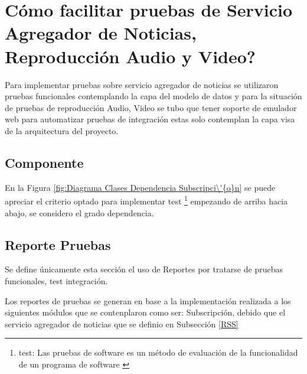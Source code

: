 \section{\textquestiondown C\'{o}mo facilitar pruebas de Servicio Agregador de Noticias, Reproducci\'{o}n Audio y Video?}

Para implementar pruebas sobre servicio agregador de noticias se utilizaron pruebas
funcionales contemplando la capa del modelo de datos y para la situaci\'{o}n de pruebas
de reproducci\'{o}n Audio, Video se tubo que tener soporte de emulador web para
automatizar pruebas de integraci\'{o}n estas solo contemplan la capa visa de la
arquitectura del proyecto. 

\subsection{Componente}

En la Figura \ref{fig:Diagrama Clases Dependencia Subscripci\'{o}n} se puede
apreciar el criterio optado para implementar test \footnote{test: Las pruebas
de software es un m\'{e}todo de evaluaci\'{o}n de la funcionalidad de un 
programa de software \cite{test}} 
empezando de arriba hacia abajo, se considero el grado dependencia.

\begin{minipage}{1.0\textwidth}
	\centering
	\label{fig:Diagrama Clases Dependencia Subscripci\'{o}n}
\end{minipage}


\subsection{Reporte Pruebas}

Se define \'{u}nicamente esta secci\'{o}n el uso de Reportes por tratarse de pruebas
funcionales, test integraci\'{o}n.

Los reportes de pruebas se generan en base a la implementaci\'{o}n realizada a
los siguientes m\'{o}dulos que se contenplaron como ser: Subscripci\'{o}n, debido
que el servicio agregador de noticias que se definio en Subsecci\'{o}n \ref{RSS}

